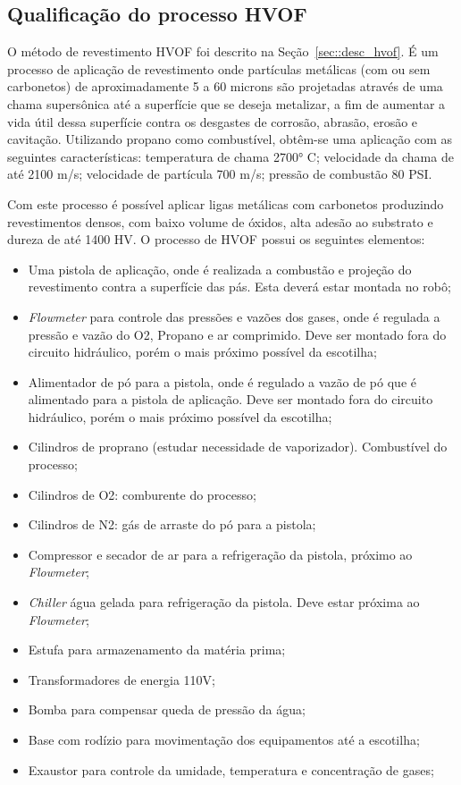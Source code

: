 \subsection{Qualificação do processo HVOF}

O método de revestimento HVOF foi descrito na Seção~\ref{sec::desc_hvof}. É um
processo de aplicação de revestimento onde partículas metálicas (com ou sem carbonetos) de
aproximadamente 5 a 60 microns são projetadas através de uma chama supersônica
até a superfície que se deseja metalizar, a fim de aumentar a vida útil dessa
superfície contra os desgastes de corrosão, abrasão, erosão e cavitação.
Utilizando propano como combustível, obtêm-se uma aplicação com as seguintes
características: temperatura de chama 2700° C; velocidade da chama de até 2100
m/s; velocidade de partícula 700 m/s; pressão de combustão 80 PSI.

Com este processo é possível aplicar ligas metálicas com carbonetos produzindo
revestimentos densos, com baixo volume de óxidos, alta adesão ao substrato e
dureza de até 1400 HV. O processo de HVOF possui os seguintes elementos:

\begin{itemize}
\item Uma pistola de aplicação, onde é realizada a combustão e projeção do
revestimento contra a superfície das pás. Esta deverá estar montada no robô;
\item \textit{Flowmeter} para controle das pressões e vazões dos gases, onde é
regulada a pressão e vazão do O2, Propano e ar comprimido. Deve ser montado
fora do circuito hidráulico, porém o mais próximo possível da escotilha;
\item Alimentador de pó para a pistola, onde é regulado a vazão de pó que é
alimentado para a pistola de aplicação. Deve ser montado fora do circuito
hidráulico, porém o mais próximo possível da escotilha;
\item Cilindros de proprano (estudar necessidade de vaporizador). Combustível 
do processo;
\item Cilindros de O2: comburente do processo;
\item Cilindros de N2: gás de arraste do pó para a pistola;
\item Compressor e secador de ar para a refrigeração da pistola, próximo ao
\textit{Flowmeter};
\item \textit{Chiller} água gelada para refrigeração da pistola. Deve estar
próxima ao \textit{Flowmeter};
\item Estufa para armazenamento da matéria prima;
\item Transformadores de energia 110V;
\item Bomba para compensar queda de pressão da água;
\item Base com rodízio para movimentação dos equipamentos até a escotilha;
\item Exaustor para controle da umidade, temperatura e concentração de gases;
\end{itemize}
 
